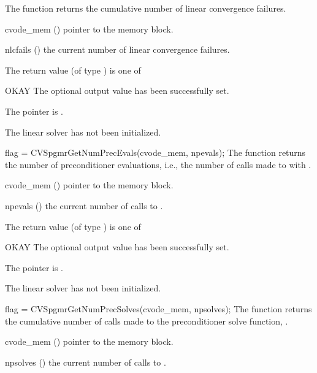 {
  The function  returns the
  cumulative number of linear convergence failures.
}
{
  \begin{args}
  \item[cvode\_mem] ()
    pointer to the {\cvode} memory block.
  \item[nlcfails] ()
    the current number of linear convergence failures.
  \end{args}
}
{
  The return value  (of type ) is one of
  \begin{args}
  \item[OKAY] 
    The optional output value has been successfully set.
  \item[\Id{LIN\_NO\_MEM}]
    The  pointer is .
  \item[\Id{LIN\_NO\_LMEM}]
    The {\cvspgmr} linear solver has not been initialized.
  \end{args}
}
{}
{
  flag = CVSpgmrGetNumPrecEvals(cvode\_mem, npevals);
}
{
  The function  returns the
  number of preconditioner evaluations, i.e., the number of 
  calls made to  with .
}
{
  \begin{args}
  \item[cvode\_mem] ()
    pointer to the {\cvode} memory block.
  \item[npevals] ()
    the current number of calls to .
  \end{args}
}
{
  The return value  (of type ) is one of
  \begin{args}
  \item[OKAY] 
    The optional output value has been successfully set.
  \item[\Id{LIN\_NO\_MEM}]
    The  pointer is .
  \item[\Id{LIN\_NO\_LMEM}]
    The {\cvspgmr} linear solver has not been initialized.
  \end{args}
}
{}
{
  flag = CVSpgmrGetNumPrecSolves(cvode\_mem, npsolves);
}
{
  The function  returns the
  cumulative number of calls made to the preconditioner 
  solve function, .
}
{
  \begin{args}
  \item[cvode\_mem] ()
    pointer to the {\cvode} memory block.
  \item[npsolves] ()
    the current number of calls to .
  \end{args}
}
